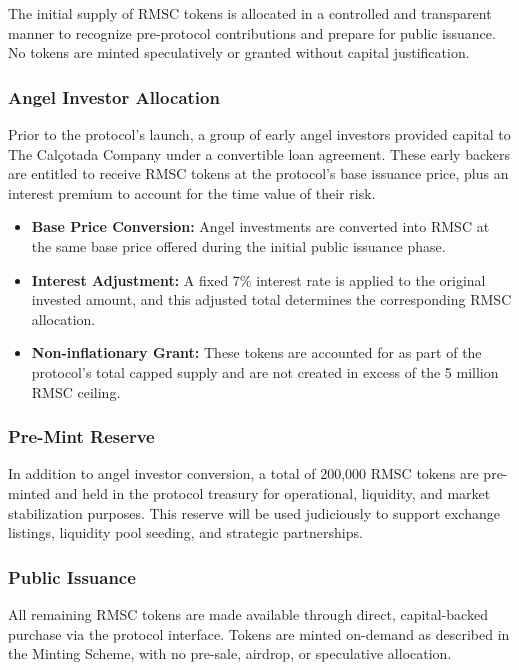 \documentclass[conference]{IEEEtran}
\begin{document}
The initial supply of RMSC tokens is allocated in a controlled and transparent manner to recognize pre-protocol contributions and prepare for public issuance. No tokens are minted speculatively or granted without capital justification.

\subsubsection{Angel Investor Allocation}

Prior to the protocol's launch, a group of early angel investors provided capital to The Calçotada Company under a convertible loan agreement. These early backers are entitled to receive RMSC tokens at the protocol’s base issuance price, plus an interest premium to account for the time value of their risk.

\begin{itemize}
    \item \textbf{Base Price Conversion:} Angel investments are converted into RMSC at the same base price offered during the initial public issuance phase.
    \item \textbf{Interest Adjustment:} A fixed 7\% interest rate is applied to the original invested amount, and this adjusted total determines the corresponding RMSC allocation.
    \item \textbf{Non-inflationary Grant:} These tokens are accounted for as part of the protocol's total capped supply and are not created in excess of the 5 million RMSC ceiling.
\end{itemize}

\subsubsection{Pre-Mint Reserve}

In addition to angel investor conversion, a total of 200,000 RMSC tokens are pre-minted and held in the protocol treasury for operational, liquidity, and market stabilization purposes. This reserve will be used judiciously to support exchange listings, liquidity pool seeding, and strategic partnerships.

\subsubsection{Public Issuance}

All remaining RMSC tokens are made available through direct, capital-backed purchase via the protocol interface. Tokens are minted on-demand as described in the Minting Scheme, with no pre-sale, airdrop, or speculative allocation.
\end{document}
